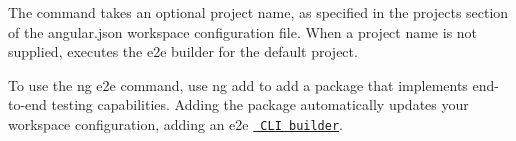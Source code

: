 The command takes an optional project name, as specified in the {\ttfamily projects} section of the {\ttfamily angular.\+json} workspace configuration file. When a project name is not supplied, executes the {\ttfamily e2e} builder for the default project.

To use the {\ttfamily ng e2e} command, use {\ttfamily ng add} to add a package that implements end-\/to-\/end testing capabilities. Adding the package automatically updates your workspace configuration, adding an {\ttfamily e2e} \href{guide/cli-builder}{\texttt{ CLI builder}}. 